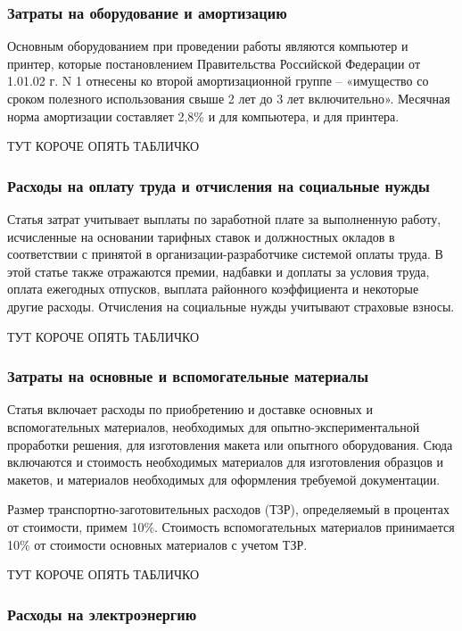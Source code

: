 \subsubsection{Затраты на оборудование и амортизацию}

Основным оборудованием при проведении работы являются компьютер и принтер, которые постановлением Правительства Российской Федерации от 1.01.02 г. N 1 отнесены ко второй амортизационной группе – «имущество со сроком полезного использования свыше 2 лет до 3 лет включительно». Месячная норма амортизации составляет 2,8\% и для компьютера, и для принтера.

ТУТ КОРОЧЕ ОПЯТЬ ТАБЛИЧКО %

\subsubsection{Расходы на оплату труда и отчисления на социальные нужды}

Статья затрат учитывает выплаты по заработной плате за выполненную работу, исчисленные на основании тарифных ставок и должностных окладов в соответствии с принятой в организации-разработчике системой оплаты труда. В этой статье также отражаются премии, надбавки и доплаты за условия труда, оплата ежегодных отпусков, выплата районного коэффициента и некоторые другие расходы. Отчисления на социальные нужды учитывают страховые взносы.

ТУТ КОРОЧЕ ОПЯТЬ ТАБЛИЧКО %

\subsubsection{Затраты на основные и вспомогательные материалы}

Статья включает расходы по приобретению и доставке основных и вспомогательных материалов, необходимых для опытно-экспериментальной проработки решения, для изготовления макета или опытного оборудования. Сюда включаются и стоимость необходимых материалов для изготовления образцов и макетов, и материалов необходимых для оформления требуемой документации. 

Размер транспортно-заготовительных расходов (ТЗР), определяемый в процентах от стоимости, примем 10\%. Стоимость вспомогательных материалов принимается 10\% от стоимости основных материалов с учетом ТЗР. 

ТУТ КОРОЧЕ ОПЯТЬ ТАБЛИЧКО %

\subsubsection{Расходы на электроэнергию}

